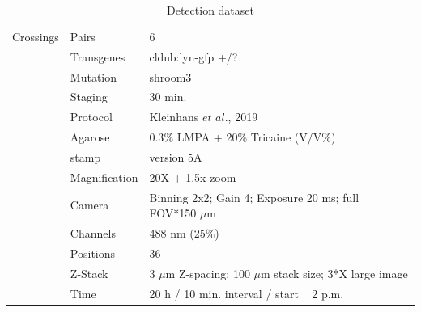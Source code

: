 \documentclass[11pt,singlespacinge,twoside]{reedthesis} %
\theoremstyle{definition}
\theoremstyle{definition}
\theoremstyle{definition}
\theoremstyle{remark}
\begin{document}
\begin{table}[!h]

\caption{\label{tab:imgdatdet}Detection dataset}
\centering
\begin{tabu} to 
\toprule
{}  Crossings & Pairs & 6\\
 & Transgenes & cldnb:lyn-gfp +/?\\

   & Mutation & shroom3\\

 & Staging & 30 min.\\

   & Protocol & Kleinhans $\textit{et al.}$, 2019\\

 & Agarose & 0.3$\%$ LMPA + 20$\%$ Tricaine (V/V$\%$)\\

   & stamp & version 5A\\

 & Magnification & 20X + 1.5x zoom\\

   & Camera & Binning 2x2; Gain 4; Exposure 20 ms; full FOV*150 $\mu$m\\

 & Channels & 488 nm (25$\%$)\\

   & Positions & 36\\

 & Z-Stack & 3 $\mu$m Z-spacing; 100 $\mu$m stack size; 3*X large image\\

   & Time & 20 h / 10 min. interval / start ~ 2 p.m.\\
\bottomrule
\end{tabu}
\end{table}
\end{document}
